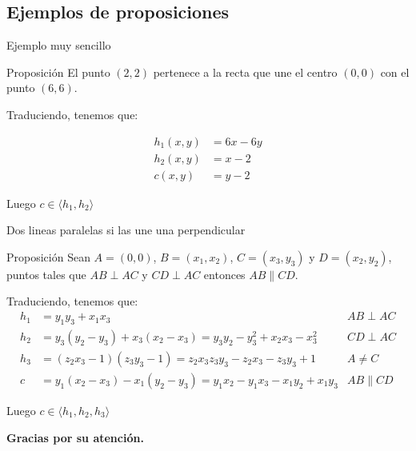 \documentclass[10pt]{beamer}
\newcommand{\gen}[1]{\ensuremath{\langle #1\rangle}}
\begin{document}
\subsection{Ejemplos de proposiciones}
\begin{frame}{Ejemplo muy sencillo}

	\begin{block}{Proposición}
		El punto $(2,2)$ pertenece a la recta que une el centro $(0,0)$ con el punto $(6,6)$.
	\end{block}

	\pause
	Traduciendo, tenemos que:

	\begin{align*}
		h_1(x,y) & = 6x-6y\\
		h_2(x,y) & = x-2\\
		c(x,y) &= y-2
	\end{align*}

	Luego $c \in \gen{h_1,h_2}$
\end{frame}

\begin{frame}{Dos lineas paralelas si las une una perpendicular}

	\begin{block}{Proposición}
		Sean $A=(0,0)$, $B=(x_1,x_2)$, $C=(x_3,y_3)$ y $D=(x_2,y_2)$, puntos tales que $AB \perp AC$ y $CD \perp AC$ entonces $AB \parallel CD$.
	\end{block}
	\pause
	Traduciendo, tenemos que:
	\begin{align*}
		h_1& =y_1y_3+x_1x_3 & AB \perp AC \\
		h_2& =y_3(y_2-y_3)+x_3(x_2-x_3) = y_3y_2-y_3^2+x_2x_3-x_3^2 & CD \perp AC\\
		h_3& =(z_2x_3-1)(z_3y_3-1)=z_2x_3z_3y_3-z_2x_3-z_3y_3+1 &  A\neq C\\
		c & = y_1(x_2-x_3)-x_1(y_2-y_3)= y_1x_2-y_1x_3-x_1y_2+x_1y_3 & AB \parallel CD
	\end{align*}

Luego $c \in \gen{h_1,h_2,h_3}$
\end{frame}
\begin{frame}
	\centering \Large \textbf{Gracias por su atención.}
\end{frame}
\end{document}

